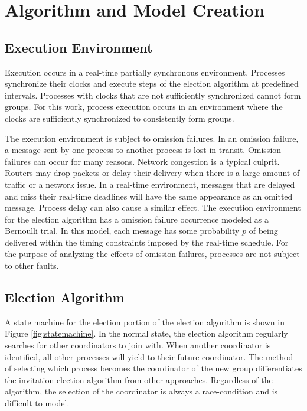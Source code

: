 \chapter{Algorithm and Model Creation}

\section{Execution Environment}

Execution occurs in a real-time partially synchronous environment.
Processes synchronize their clocks and execute steps of the election algorithm at predefined intervals.
Processes with clocks that are not sufficiently synchronized cannot form groups.
For this work, process execution occurs in an environment where the clocks are sufficiently synchronized to consistently form groups.

The execution environment is subject to omission failures.
In an omission failure, a message sent by one process to another process is lost in transit.
Omission failures can occur for many reasons.
Network congestion is a typical culprit.
Routers may drop packets or delay their delivery when there is a large amount of traffic or a network issue.
In a real-time environment, messages that are delayed and miss their real-time deadlines will have the same appearance as an omitted message.
Process delay can also cause a similar effect.
The execution environment for the election algorithm has a omission failure occurrence modeled as a Bernoulli trial.
In this model, each message has some probability $p$ of being delivered within the timing constraints imposed by the real-time schedule.
For the purpose of analyzing the effects of omission failures, processes are not subject to other faults.

\section{Election Algorithm}

A state machine for the election portion of the election algorithm is shown in Figure \ref{fig:statemachine}.
In the normal state, the election algorithm regularly searches for other coordinators to join with.
When another coordinator is identified, all other processes will yield to their future coordinator.
The method of selecting which process becomes the coordinator of the new group differentiates the invitation election algorithm from other approaches.
Regardless of the algorithm, the selection of the coordinator is always a race-condition and is difficult to model.

